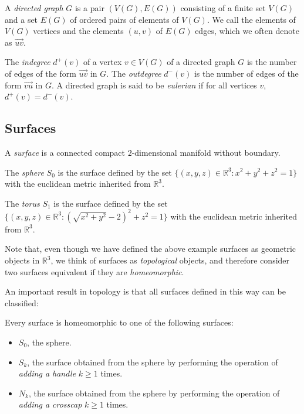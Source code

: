 \begin{definition}
A \emph{directed graph} $G$ is a pair $(V(G), E(G))$ consisting of a finite set $V(G)$ and a set 
$E(G)$ of ordered pairs of elements
 of $V(G)$. We call the elements of $V(G)$ vertices and
the elements $(u, v)$ of $E(G)$ edges, which we often denote as $\overrightarrow{uv}$.
\end{definition}

\begin{definition}
	The \emph{indegree} $d^+(v)$ of a vertex $v \in V(G)$ of a directed graph $G$ is the number
	of edges of the form $\overrightarrow{uv}$ in $G$. The \emph{outdegree} $d^-(v)$ is the number
	of edges of the form $\overrightarrow{vu}$ in $G$. A directed graph is said to be 
	\emph{eulerian} if for all vertices $v$, $d^+(v) = d^-(v)$. 
\end{definition}



\subsection{Surfaces}

\begin{definition}
A \emph{surface} is a connected compact $2$-dimensional manifold without boundary. 
\end{definition}

\begin{example}
The \emph{sphere} $S_0$ is the surface defined by the set $\{(x, y, z) \in \mathbb{R}^3 : x^2+y^2
+z^2 = 1\}$ with the euclidean metric inherited from $\mathbb{R}^3$. 

The \emph{torus} $S_1$ is the surface defined by the set $\{(x, y, z) \in \mathbb{R}^3 :  (\sqrt{x^2 + y^2} - 2)^2 + z^2 = 1\}$ with the euclidean metric inherited from $\mathbb{R}^3$.
\end{example}

Note that, even though we have defined the above example surfaces as geometric objects in
$\mathbb{R}^3$, we think of surfaces as \emph{topological} objects, and therefore consider two
surfaces equivalent if they are \emph{homeomorphic}. 

An important result in topology is that all surfaces defined in this way can be classified:

\begin{theorem}
\label{classificationsurfacestheorem}
Every surface is homeomorphic to one of the following surfaces:

\begin{itemize}
	\item $S_0$, the sphere.
	\item $S_k$, the surface obtained from the sphere by performing the operation
	of \emph{adding a handle}  $k \geq 1$ times.
	\item $N_k$, the surface obtained from the sphere by performing the operation
	of \emph{adding a crosscap} $k \geq 1$ times.
\end{itemize}
\end{theorem}

